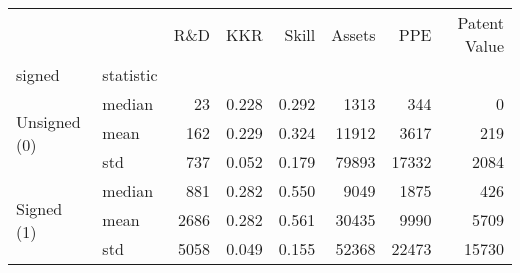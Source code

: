 \begin{tabular}{llrrrrrr}
\toprule
 &  & R\&D & KKR & Skill & Assets & PPE & Patent Value \\
signed & statistic &  &  &  &  &  &  \\
\midrule
\multirow[t]{3}{*}{Unsigned (0)} & median & 23 & 0.228 & 0.292 & 1313 & 344 & 0 \\
 & mean & 162 & 0.229 & 0.324 & 11912 & 3617 & 219 \\
 & std & 737 & 0.052 & 0.179 & 79893 & 17332 & 2084 \\
\cline{1-8}
\multirow[t]{3}{*}{Signed (1)} & median & 881 & 0.282 & 0.550 & 9049 & 1875 & 426 \\
 & mean & 2686 & 0.282 & 0.561 & 30435 & 9990 & 5709 \\
 & std & 5058 & 0.049 & 0.155 & 52368 & 22473 & 15730 \\
\cline{1-8}
\bottomrule
\end{tabular}
